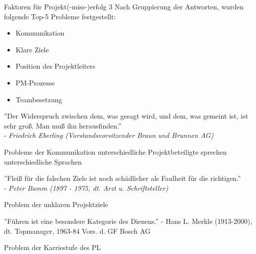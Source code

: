 \documentclass[10pt]{beamer}
\begin{document}
	\begin{frame}{Faktoren für Projekt(-miss-)erfolg 3}
		Nach Gruppierung der Antworten, wurden folgende Top-5 Probleme festgestellt:
		\begin{itemize}
			\item{Kommunikation}
			\item{Klare Ziele}
			\item{Position des Projektleiters}
			\item{PM-Prozesse}
			\item{Teambesetzung}
		\end{itemize}

	\end{frame}
	
	\thispagestyle{empty}
	\begin{frame}
		''Der Widerspruch zwischen dem, was gesagt wird, und dem, was gemeint ist, ist sehr groß. Man muß ihn herausfinden.'' \\ 
		- \textit{Friedrich Eberling (Vorstandsvorsitzender Braun und Brunnen AG)}
	\end{frame}

	\begin{frame}{Probleme der Kommunikation}
		unterschiedliche Projektbeteiligte sprechen unterschiedliche Sprachen
	\end{frame}

	\thispagestyle{empty}
	\begin{frame}
		''Fleiß für die falschen Ziele ist noch schädlicher als Faulheit für die richtigen.'' \\
		- \textit{Peter Bamm (1897 - 1975, dt. Arzt u. Schriftsteller)}
	\end{frame}

	
	\begin{frame}{Problem der unklaren Projektziele}
		
	\end{frame}

	\thispagestyle{empty}
	\begin{frame}
		''Führen ist eine besondere Kategorie des Dienens.'' - Hans L. Merkle (1913-2000), dt. Topmanager, 1963-84 Vors. d. GF Bosch AG
	\end{frame}


	\begin{frame}{Problem der Karriestufe des PL}
		
	\end{frame}

	\thispagestyle{empty}
	\begin{frame}
		
	\end{frame}
\end{document}
